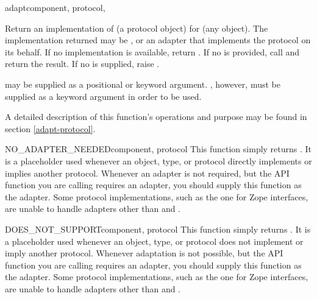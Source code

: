 \begin{verbatim%
}
\begin{verbatim%
}
\begin{verbatim%
}
\begin{verbatim%
}
\begin{funcdesc}{adapt}{component, protocol,
}

Return an implementation of  (a protocol object) for
 (any object).  The implementation returned may be
, or an adapter that implements the protocol on its
behalf.  If no implementation is available, return .  If no
 is provided, call  and return the result.  If no  is supplied,
raise .

 may be supplied as a positional or keyword argument.
, however, must be supplied as a keyword argument in order
to be used.

A detailed description of this function's operations and purpose may be found in
section \ref{adapt-protocol}.
\end{funcdesc}

\begin{funcdesc}{NO_ADAPTER_NEEDED}{component, protocol}
This function simply returns .  It is a placeholder used whenever
an object, type, or protocol directly implements or implies another protocol.
Whenever an adapter is not required, but the  API function
you are calling requires an adapter, you should supply this function as the
adapter.  Some protocol implementations, such as the one for Zope interfaces,
are unable to handle adapters other than  and
.
\end{funcdesc}

\begin{funcdesc}{DOES_NOT_SUPPORT}{component, protocol}
This function simply returns .  It is a placeholder used whenever
an object, type, or protocol does not implement or imply another protocol.
Whenever adaptation is not possible, but the  API function
you are calling requires an adapter, you should supply this function as the
adapter.  Some protocol implementations, such as the one for Zope interfaces,
are unable to handle adapters other than  and
.
\end{funcdesc}


\end{verbatim%
}
\end{verbatim%
}
\end{verbatim%
}
\end{verbatim%
}
